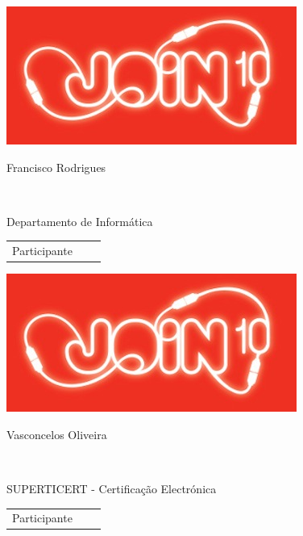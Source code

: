 \documentclass[twocolumn]{article}
\begin{document}
  
 \vspace{13mm} 
 \begin{minipage}{89mm} 
 \includegraphics{design/logo}\\ 
 
 \addvspace{5mm} 
 
 \begin{center} 
 \huge{Francisco Rodrigues} 
 \scriptsize{ 
 \begin{tabular*}{0.75\textwidth}{c} 
 \hline 
 \end{tabular*}}\\ 
Departamento de Informática
 \end{center} 
 
 \begin{flushright} 
 \begin{tabular}{r l l} 
 \normalsize{Participante} & & 
 \end{tabular} 
 \end{flushright} 
 \end{minipage} 
 
  \newpage 
 
 \begin{minipage}{89mm} 
 \includegraphics{design/logo}\\ 
 
 \addvspace{5mm} 
 
 \begin{center} 
 \huge{Vasconcelos Oliveira} 
 \scriptsize{ 
 \begin{tabular*}{0.75\textwidth}{c} 
 \hline 
 \end{tabular*}}\\ 
SUPERTICERT - Certificação Electrónica
 \end{center} 
 
 \begin{flushright} 
 \begin{tabular}{r l l} 
 \normalsize{Participante} & & 
 \end{tabular} 
 \end{flushright} 
 \end{minipage} 
 
  
 
\end{document}
